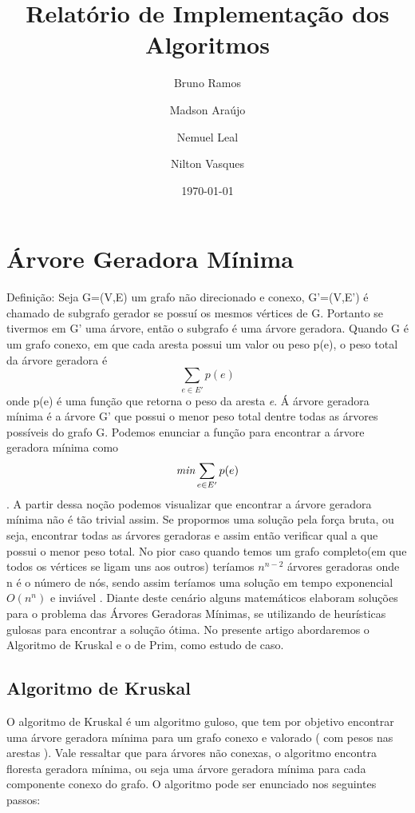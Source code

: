\documentclass[a4paper,12pt]{article}
\begin{document}
\title{Relatório de Implementação dos Algoritmos}
\author{Bruno Ramos \and Madson Araújo \and Nemuel Leal \and Nilton Vasques}
\date{\today}
\maketitle

\section{Árvore Geradora Mínima}
Definição: Seja G=(V,E) um grafo não direcionado e conexo, G'=(V,E') é chamado de subgrafo gerador se possuí os mesmos vértices de G. Portanto se tivermos em G' uma árvore, então o subgrafo é uma árvore geradora. 
Quando G é um grafo conexo, em que cada aresta possui um valor ou peso p(e), o peso total da árvore geradora é \[\sum_{e \in E'}p(e)\] onde p(e) é uma função que retorna o peso da aresta \emph{e}. Á árvore geradora mínima é a árvore G' que possui o menor peso total dentre todas as árvores possíveis do grafo G\cite{nogueira}. Podemos enunciar a função para encontrar a árvore geradora mínima como \[\emph{min}\sum_{e\in E'}p(e)\].
A partir dessa noção podemos visualizar que encontrar a árvore geradora mínima não é tão trivial assim. Se propormos uma solução pela força bruta, ou seja, encontrar todas as árvores geradoras e assim então verificar qual a que possui o menor peso total. No pior caso quando temos um grafo completo(em que todos os vértices se ligam uns aos outros) teríamos $n^{n-2}$ árvores geradoras onde n é o número de nós, sendo assim teríamos uma solução em tempo exponencial $O(n^n)$ e inviável \nocite{*}.
Diante deste cenário alguns matemáticos elaboram soluções para o problema das Árvores Geradoras Mínimas, se utilizando de heurísticas gulosas para encontrar a solução ótima. No presente artigo abordaremos o Algoritmo de Kruskal e o de Prim, como estudo de caso.

\subsection{Algoritmo de Kruskal}
O algoritmo de Kruskal é um algoritmo guloso, que tem por objetivo encontrar uma árvore geradora mínima para um grafo conexo e valorado ( com pesos nas arestas ). Vale ressaltar que para árvores não conexas, o algoritmo encontra floresta geradora mínima, ou seja uma árvore geradora mínima para cada componente conexo do grafo. O algoritmo pode ser enunciado nos seguintes passos:
\end{document}
